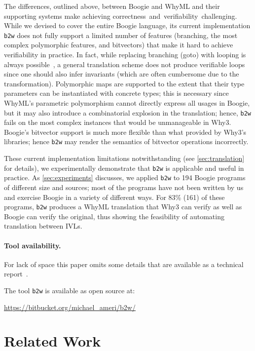 \documentclass[a4paper,final]{llncs}
\makeatletter
\newif\iflong
\newcommand{\btw}{\texttt{b2w}\xspace}
\newcommand{\Boogie}{Boogie\xspace}
\newcommand{\WhyML}{WhyML\xspace}
\newcommand{\Why}{Why3\xspace}
\newcommand{\tightParagraph}[1]{\paragraph{#1}}
\newcommand\tightParagraph{\@startsection{paragraph}{4}{\z@}{-5\p@ \@plus -4\p@ \@minus -4\p@}{-0.5em \@plus -0.22em \@minus -0.1em}{\normalfont\normalsize\itshape}}
\makeatother
\begin{document}
The differences, outlined above, between \Boogie and \WhyML and their supporting systems make achieving correctness\iflong,\else\ and\fi\ verifiability\iflong, and readability\fi\ challenging.
While we devised  to cover the entire \Boogie language, its current implementation \btw does not fully support a limited number of features (branching, the most complex polymorphic features, and bitvectors) that make it hard to achieve verifiability in practice.
In fact, while replacing branching (goto) with looping is always possible~\cite{Harel-folk}, a general translation scheme does not produce verifiable loops since one should also infer invariants (which are often cumbersome due to the transformation).
Polymorphic maps are supported to the extent that their type parameters can be instantiated with concrete types; this is necessary since \WhyML's parametric polymorphism cannot directly express all usages in \Boogie, but it may also introduce a combinatorial explosion in the translation; hence, \btw fails on the most complex instances that would be unmanageable in \Why.
\Boogie's bitvector support is much more flexible than what provided by \Why's libraries; hence \btw may render the semantics of bitvector operations incorrectly.

These current implementation limitations notwithstanding (see \autoref{sec:translation} for details), we experimentally demonstrate that \btw is applicable and useful in practice.
As \autoref{sec:experiments} discusses, we applied \btw to 194 \Boogie programs of different size and sources; most of the programs have not been written by us and exercise \Boogie in a variety of different ways.
For 83\% (161) of these programs, \btw produces a \WhyML translation that \Why can verify as well as \Boogie can verify the original, thus showing the feasibility of automating translation between IVLs. 


\tightParagraph{Tool availability.}
\iflong\else
For lack of space this paper omits some details that are available as a technical report~\cite{extended-version}.
\fi
The tool \btw is available as open source at:
\iflong\begin{center} \fi
\url{https://bitbucket.org/michael_ameri/b2w/}
\iflong\end{center}\fi








\section{Related Work}\label{sec:related-work}
\end{document}
